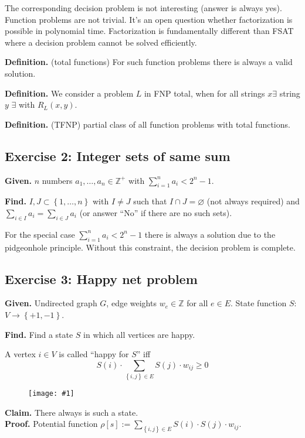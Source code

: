 \documentclass[a4paper]{article}
\newcommand{\drawing}[1]{%
 \begin{figure}[ht]
  \begin{center}
   \texttt{[image: \#1]}
  \end{center}
 \end{figure}
}
\newcommand{\given}[1]{\textbf{Given.} #1\par}
\newcommand{\find}[1]{\textbf{Find.} #1\par}
\newcommand{\cls}[1]{\rm{#1}}
\newcommand{\set}[1]{\left\{#1\right\}}
\newenvironment{spec}[0]{\begin{framed}}{\end{framed}}
\begin{document}
The corresponding decision problem is not interesting (answer is always yes).
Function problems are not trivial. It's an open question whether factorization is possible
in polynomial time.
Factorization is fundamentally different than FSAT where a decision problem cannot be solved
efficiently.

\textbf{Definition.} (total functions) For such function problems there is always a valid solution.

\textbf{Definition.} We consider a problem $L$ in F\cls{NP} total, when for all strings $x \exists$
string $y$ $\exists$ with $R_L(x,y)$.

\textbf{Definition.} (TF\cls{NP}) partial class of all function problems with total functions.

\subsection{Exercise 2: Integer sets of same sum}
\label{sec:same-sum-integer-sets}
%
\begin{spec}
  \given{$n$ numbers $a_1, \ldots, a_n \in \mathbb{Z}^+$ with $\sum_{i=1}^n a_i < 2^n-1$.}
  \find{$I, J \subset \set{1,\ldots,n}$ with $I \neq J$ such that $I \cap J = \diameter$ (not always required) and $\sum_{i\in I} a_i = \sum_{i\in J} a_i$ (or answer ``No'' if there are no such sets).}
\end{spec}

For the special case $\sum_{i=1}^n a_i < 2^n -1$ there is always a solution due to the
pidgeonhole principle. Without this constraint, the decision problem is complete.

\subsection{Exercise 3: Happy net problem}
\label{sec:happy-net-problem}
%
\begin{spec}
  \given{Undirected graph $G$, edge weights $w_e \in \mathbb{Z}$ for all $e \in E$. State function $S$: $V \rightarrow \set{+1, -1}$.}
  \find{Find a state $S$ in which all vertices are happy.}
\end{spec}

A vertex $i \in V$ is called ``happy for $S$'' iff
\[ S(i) \cdot \sum_{\set{i,j}\in E} S(j) \cdot w_{ij} \geq 0 \]

\drawing{happy_vertices.pdf}

\textbf{Claim.} There always is such a state. \\
\textbf{Proof.} Potential function $\rho[s] := \sum_{\set{i,j} \in E} S(i) \cdot S(j) \cdot w_{ij}$.
\end{document}
